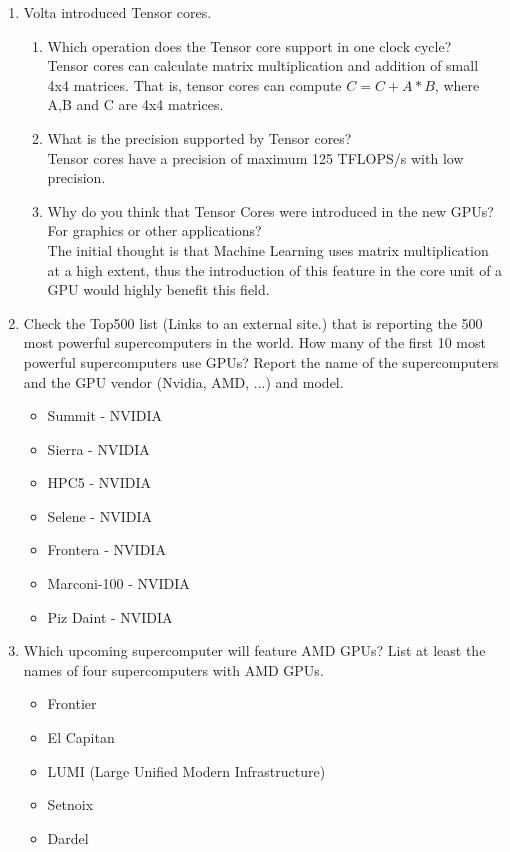 \documentclass[english]{exam}
\begin{document}
\begin{enumerate}
\item Volta introduced Tensor cores.
  \begin{enumerate}
  \item Which operation does the Tensor core support in one clock cycle?\\
    Tensor cores can calculate matrix multiplication and addition of small 4x4 matrices. That is, tensor cores can compute $C = C + A * B$, where A,B and C are 4x4 matrices.
  \item What is the precision supported by Tensor cores?\\
    Tensor cores have a precision of maximum 125 TFLOPS/s with low precision.
  \item Why do you think that Tensor Cores were introduced in the new GPUs? For graphics or other applications?\\
    The initial thought is that Machine Learning uses matrix multiplication at a high extent, thus the introduction of this feature in the core unit of a GPU would highly benefit this field.
  \end{enumerate}
\item Check the Top500 list (Links to an external site.) that is reporting the 500 most powerful supercomputers in the world. How many of the first 10 most powerful supercomputers use GPUs? Report the name of the supercomputers and the GPU vendor (Nvidia, AMD, ...) and model.
  \begin{itemize}
  \item Summit - NVIDIA
  \item Sierra - NVIDIA
  \item HPC5 - NVIDIA
  \item Selene - NVIDIA
  \item Frontera - NVIDIA
  \item Marconi-100 - NVIDIA
  \item Piz Daint - NVIDIA
  \end{itemize}
\item Which upcoming supercomputer will feature AMD GPUs? List at least the names of four supercomputers with AMD GPUs.
  \begin{itemize}
  \item Frontier
  \item El Capitan
  \item LUMI (Large Unified Modern Infrastructure)
  \item Setnoix
  \item Dardel
  \end{itemize}

\end{enumerate}
\end{document}
